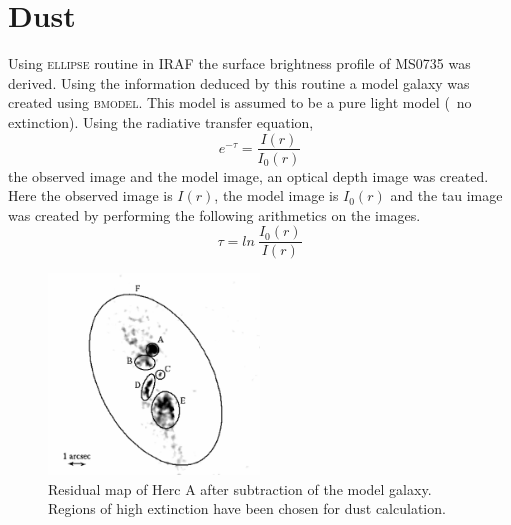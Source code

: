 \documentclass[12pt, preprint]{aastex}
\begin{document}
\section{Dust}

Using \textsc{ellipse} routine in IRAF the surface brightness profile
of MS0735 was derived. Using the information deduced by this routine a
model galaxy was created using \textsc{bmodel}. This model is assumed
to be a pure light model (\ie\ no extinction). Using the radiative
transfer equation,
\begin{equation}
  e^{-\tau} = \frac{I(r)}{I_0(r)}
\end{equation}
the observed image and the model image, an optical depth image was
created. Here the observed image is $I(r)$, the model image is
$I_0(r)$ and the tau image was created by performing the
following arithmetics on the images.
\begin{equation}
  \tau = ln~\frac{I_0(r)}{I(r)}
\end{equation}

\begin{figure}[ht]
  \begin{center}
    \includegraphics[width=0.5\textwidth]{dustregion.eps}
    \caption{Residual map of Herc A after subtraction of the model
      galaxy. Regions of high extinction have been chosen for dust
      calculation.}
  \end{center}
\end{figure}
\end{document}
